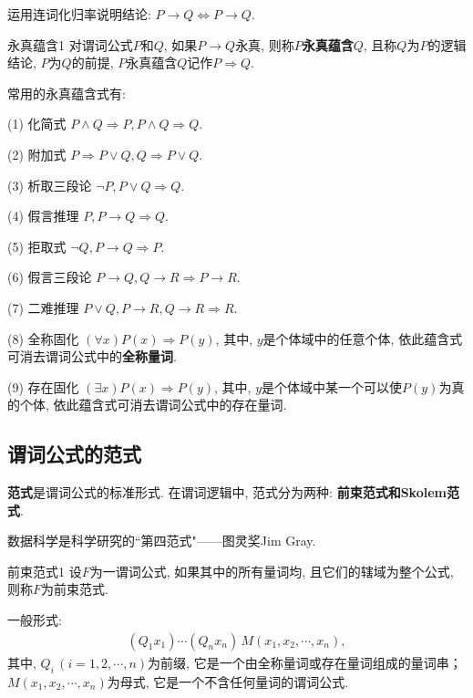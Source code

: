 \begin{newexam}
    运用连词化归率说明结论: $ P\rightarrow Q \Leftrightarrow P\rightarrow Q$.
\end{newexam}
\begin{mydef}{永真蕴含}{1}
对谓词公式$P$和$Q$, 如果$P\rightarrow Q$永真, 则称\textbf{$P$永真蕴含$Q$}, 且称$Q$为$P$的逻辑结论, $P$为$Q$的前提, $P$永真蕴含$Q$记作\textcolor[rgb]{0,0,1}{$P \Rightarrow Q$}.
\end{mydef}

常用的永真蕴含式有:

      (1) 化简式     $P\wedge Q \Rightarrow  P,   P\wedge Q \Rightarrow Q$.

      (2) 附加式     $P \Rightarrow P\vee Q,   Q \Rightarrow  P\vee Q$.

      (3) \textcolor[rgb]{0,0,1}{析取三段论}    $\neg P, P\vee Q \Rightarrow  Q$.

      (4) \textcolor[rgb]{0,0,1}{假言推理}       $ P, P\rightarrow Q \Rightarrow  Q$.

      (5) \textcolor[rgb]{0,0,1}{拒取式}           $ \neg Q,  P\rightarrow Q \Rightarrow  P$.

      (6) \textcolor[rgb]{0,0,1}{假言三段论}     $P\rightarrow Q,  Q\rightarrow R \Rightarrow P\rightarrow R$.

      (7) \textcolor[rgb]{0,0,1}{二难推理}       $ P\vee Q,  P\rightarrow R, Q\rightarrow R \Rightarrow  R$.

      (8) 全称固化        $(\forall x)P(x) \Rightarrow P(y)$, 其中, $y$是个体域中的任意个体, 依此蕴含式可消去谓词公式中的\textbf{全称量词}.

      (9) 存在固化 $(\exists x)P(x) \Rightarrow P(y)$, 其中, $y$是个体域中某一个可以使$P(y)$为真的个体, 依此蕴含式可消去谓词公式中的存在量词.
\subsection{谓词公式的范式}
\textbf{范式}是谓词公式的标准形式. 在谓词逻辑中, 范式分为两种: \textbf{前束范式和Skolem范式}.
\begin{remark}
  数据科学是科学研究的``第四范式"——图灵奖Jim Gray.
\end{remark}
\begin{mydef}{前束范式}{1}
设$F$为一谓词公式, 如果其中的所有量词均, 且它们的辖域为整个公式, 则称$F$为前束范式.

一般形式:
\begin{align}
  (Q_1 x_1)\cdots (Q_n x_n)\,M(x_1, x_2,\cdots, x_n),
\end{align}
其中, $Q_i\,(i=1,2,\cdots,n)$为前缀, 它是一个由全称量词或存在量词组成的量词串； $M(x_1,x_2,\cdots,x_n)$为母式, 它是一个不含任何量词的谓词公式.
\end{mydef}

